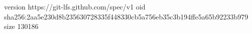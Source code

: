 version https://git-lfs.github.com/spec/v1
oid sha256:2aa5e230d8b235630728335f448330cb5a756eb35c3b194ffe5a65b92233b979
size 130186
